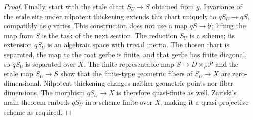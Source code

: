 \begin{proof}
Finally, start with the etale chart $S_U\to S$ obtained from $g$.
Invariance of the etale site under nilpotent thickening extends
this chart uniquely to $qS_U\to qS$, compatibly as $q$ varies.
This construction does not use a map $qS\to\mathcal Y$;
lifting the map from $S$ is the task of the next section.
The reduction $S_U$ is a scheme; its extension $qS_U$ is an
algebraic space with trivial inertia.  The chosen chart is
separated, the map to the root gerbe is finite, and that gerbe
has finite diagonal, so $qS_U$ is separated over $X$.
The finite representable map $S\to D\times_P\mathcal P$
and the etale map $S_U\to S$ show that the finite-type
geometric fibers of $S_U\to X$ are zero-dimensional.
Nilpotent thickening changes neither geometric points nor
fiber dimensions. The morphism $qS_U\to X$
is therefore quasi-finite as well.  Zariski's main theorem
embeds $qS_U$ in a scheme finite over $X$, making it a
quasi-projective scheme as required.
\end{proof}
